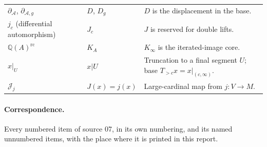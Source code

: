\documentclass[11pt,a4paper]{article}
\numberwithin{equation}{section}
\theoremstyle{plain}
\theoremstyle{definition}
\theoremstyle{remark}
\newcommand{\Q}{\mathbb{Q}}
\begin{document}
\begin{longtable}{P{38mm}P{36mm}P{76mm}}
$\partial_{\mathcal A}$, $\partial_{\mathcal A,g}$ & $D$, $D_g$ & $D$ is the displacement in the base. \\
$j_c$ (differential automorphism) & $J_c$ & $J$ is reserved for double lifts. \\
$\Q(A)^{\mathrm{rc}}$ & $K_A$ & $K_\infty$ is the iterated-image core. \\
$x|_U$ & $x|U$ & Truncation to a final segment $U$; base $T_{>c}x=x|_{(c,\infty)}$. \\
$\mathcal J_j$ & $J(x)=j(x)$ & Large-cardinal map from $j:V\to M$. \\
\bottomrule
\end{longtable}
\endgroup

\paragraph{Correspondence.} Every numbered item of source 07, in its own
numbering, and its named unnumbered items, with the place where it is
printed in this report.
\end{document}
